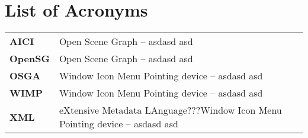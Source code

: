 \chapter*{List of Acronyms}


\begin{tabular}{ll}

\textbf{AICI} & Open Scene Graph -- asdasd asd \\

\textbf{OpenSG} & Open Scene Graph -- asdasd asd \\

\textbf{OSGA} & Window Icon Menu Pointing device -- asdasd asd \\

\textbf{WIMP} & Window Icon Menu Pointing device -- asdasd asd \\

\textbf{XML} & eXtensive Metadata LAnguage???Window Icon Menu Pointing device -- asdasd asd \\

\end{tabular}
